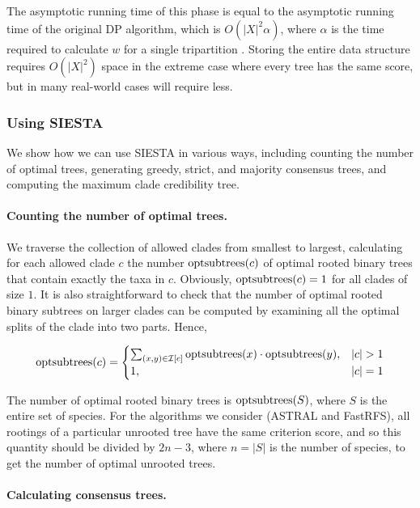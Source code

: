 The asymptotic running time of this phase is equal to the asymptotic running time of the original DP algorithm, which  is $O(|X|^2 \alpha)$, where $\alpha$ is the time required to calculate $w$ for a single tripartition \cite{mirarab2014astral}.
Storing the entire data structure requires $O(|X|^2)$ space in the extreme case where every tree has the same score, but in many real-world cases will require less.

  \setcounter{secnumdepth}{3}

\subsubsection{Using SIESTA}
We show how we can use SIESTA in various ways, including counting the number of optimal trees, generating greedy, strict, and majority consensus trees, and computing the maximum clade credibility tree.

\paragraph{Counting the number of optimal trees. }
 
We traverse the collection of allowed clades from smallest to largest, calculating for each allowed clade $c$ the number  $\mathop{\rm optsubtrees}(c)$ of optimal rooted binary trees that contain exactly the taxa in $c$. Obviously, $\mathop{\rm optsubtrees}(c)=1$ for all clades of size $1$.
It is also straightforward to check that the number of optimal rooted binary subtrees on larger clades can be computed by examining all the optimal splits of the clade into two parts. Hence, 

\[
\mathop{\rm optsubtrees}(c) = 
\begin{cases}
\sum_{(x, y) \in \mathcal{I}[c]}  \mathop{\rm optsubtrees}(x) \cdot \mathop{\rm optsubtrees}(y),  & |c|>1 
\\
 1, & |c|=1
\end{cases}
\]

The number of optimal rooted binary trees is $\mathop{\rm optsubtrees}(S)$, where $S$ is the entire set of species.
For the algorithms we consider (ASTRAL and FastRFS), all rootings of a particular unrooted tree have the same criterion score, and so this  quantity should be divided by $2n - 3$, where $n=|S|$ is the number of species, to get the number of optimal unrooted trees.

\paragraph{Calculating consensus trees. }

